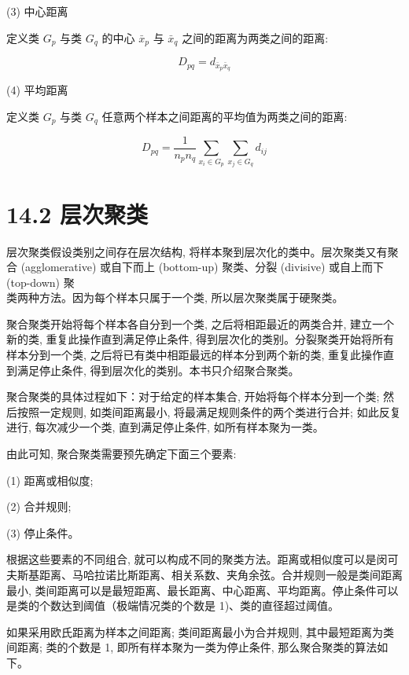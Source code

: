 \documentclass[10pt]{article}
\begin{document}
(3) 中心距离

定义类 $G_{p}$ 与类 $G_{q}$ 的中心 $\bar{x}_{p}$ 与 $\bar{x}_{q}$ 之间的距离为两类之间的距离:


\begin{equation*}
D_{p q}=d_{\bar{x}_{p} \bar{x}_{q}} \tag{14.16}
\end{equation*}


(4) 平均距离

定义类 $G_{p}$ 与类 $G_{q}$ 任意两个样本之间距离的平均值为两类之间的距离:


\begin{equation*}
D_{p q}=\frac{1}{n_{p} n_{q}} \sum_{x_{i} \in G_{p}} \sum_{x_{j} \in G_{q}} d_{i j} \tag{14.17}
\end{equation*}


\section*{14.2 层次聚类}
层次聚类假设类别之间存在层次结构, 将样本聚到层次化的类中。层次聚类又有聚合 (agglomerative) 或自下而上 (bottom-up) 聚类、分裂 (divisive) 或自上而下 (top-down) 聚\\
类两种方法。因为每个样本只属于一个类, 所以层次聚类属于硬聚类。

聚合聚类开始将每个样本各自分到一个类, 之后将相距最近的两类合并, 建立一个新的类, 重复此操作直到满足停止条件, 得到层次化的类别。分裂聚类开始将所有样本分到一个类, 之后将已有类中相距最远的样本分到两个新的类, 重复此操作直到满足停止条件, 得到层次化的类别。本书只介绍聚合聚类。

聚合聚类的具体过程如下：对于给定的样本集合, 开始将每个样本分到一个类; 然后按照一定规则, 如类间距离最小, 将最满足规则条件的两个类进行合并; 如此反复进行, 每次减少一个类, 直到满足停止条件, 如所有样本聚为一类。

由此可知, 聚合聚类需要预先确定下面三个要素:

(1) 距离或相似度;

(2) 合并规则;

(3) 停止条件。

根据这些要素的不同组合, 就可以构成不同的聚类方法。距离或相似度可以是闵可夫斯基距离、马哈拉诺比斯距离、相关系数、夹角余弦。合并规则一般是类间距离最小, 类间距离可以是最短距离、最长距离、中心距离、平均距离。停止条件可以是类的个数达到阈值（极端情况类的个数是 1)、类的直径超过阈值。

如果采用欧氏距离为样本之间距离; 类间距离最小为合并规则, 其中最短距离为类间距离; 类的个数是 1, 即所有样本聚为一类为停止条件, 那么聚合聚类的算法如下。
\end{document}
